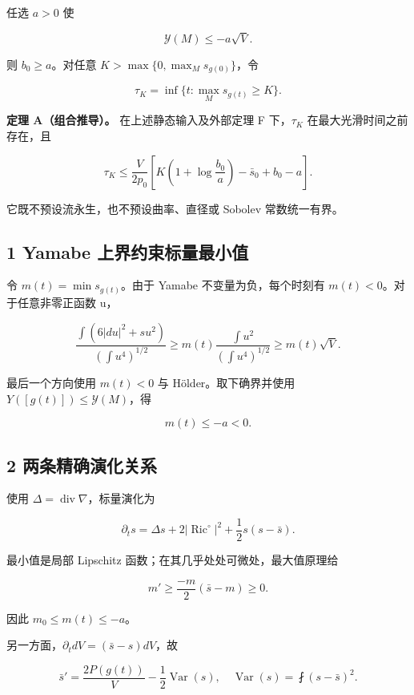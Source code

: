 \documentclass[UTF8,11pt,openany,oneside,fontset=none]{ctexbook}
\begin{document}
任选 \(a>0\) 使

\[
 \mathcal Y(M)\le-a\sqrt V.
\]

则 \(b_0\ge a\)。对任意 \(K>\max\{0,\max_Ms_{g(0)}\}\)，令

\[
 \tau_K=\inf\{t:\max_Ms_{g(t)}\ge K\}.
\]

\textbf{定理 A（组合推导）。} 在上述静态输入及外部定理 F 下，\(\tau_K\) 在最大光滑时间之前存在，且

\[
 \boxed{
 \tau_K\le\frac{V}{2p_0}
 \left[
 K\left(1+\log\frac{b_0}{a}\right)-\bar s_0+b_0-a
 \right].
 }
\tag{7.1}\label{eq:r7:1}
\]

它既不预设流永生，也不预设曲率、直径或 Sobolev 常数统一有界。

\subsection{1 Yamabe 上界约束标量最小值}\label{ch7:yamabe-ux4e0aux754cux7ea6ux675fux6807ux91cfux6700ux5c0fux503c}

令 \(m(t)=\min s_{g(t)}\)。由于 Yamabe 不变量为负，每个时刻有 \(m(t)<0\)。对于任意非零正函数 u，

\[
 \frac{\int(6|du|^2+s u^2)}{(\int u^4)^{1/2}}
 \ge m(t)\frac{\int u^2}{(\int u^4)^{1/2}}
 \ge m(t)\sqrt V.
\]

最后一个方向使用 \(m(t)<0\) 与 Hölder。取下确界并使用 \(Y([g(t)])\le\mathcal Y(M)\)，得

\[
 \boxed{m(t)\le-a<0.}
\tag{7.2}\label{eq:r7:2}
\]

\subsection{2 两条精确演化关系}\label{ch7:ux4e24ux6761ux7cbeux786eux6f14ux5316ux5173ux7cfb}

使用 \(\Delta=\operatorname{div}\nabla\)，标量演化为

\[
 \partial_t s=\Delta s+2|\operatorname{Ric}^{\circ}|^2
             +\frac12s(s-\bar s).
\]

最小值是局部 Lipschitz 函数；在其几乎处处可微处，最大值原理给

\[
 m'\ge\frac{-m}{2}(\bar s-m)\ge0.
\tag{7.3}\label{eq:r7:3}
\]

因此 \(m_0\le m(t)\le-a\)。

另一方面，\(\partial_t dV=(\bar s-s)dV\)，故

\[
 \boxed{
 \bar s'=\frac{2P(g(t))}{V}-\frac12\operatorname{Var}(s),
 \quad \operatorname{Var}(s)=\fint(s-\bar s)^2.
 }
\tag{7.4}\label{eq:r7:4}
\]
\end{document}
